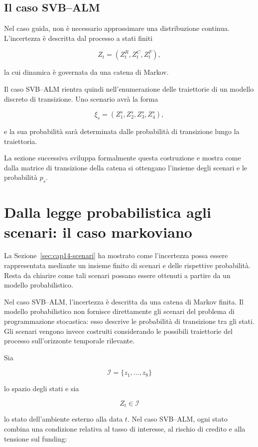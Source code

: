 \subsection{Il caso SVB--ALM}

Nel caso guida, non \`e necessario approssimare una distribuzione continua.
L'incertezza \`e descritta dal processo a stati finiti

\[
Z_t=(Z_t^R,Z_t^C,Z_t^F),
\]

\noindent la cui dinamica \`e governata da una catena di Markov.

Il caso SVB--ALM rientra quindi nell'enumerazione delle traiettorie di un
modello discreto di transizione. Uno scenario avr\`a la forma

\[
\xi_s=
\left(
Z_1^s,Z_2^s,Z_3^s,Z_4^s
\right),
\]

\noindent e la sua probabilit\`a sar\`a determinata dalle probabilit\`a di transizione
lungo la traiettoria.

La sezione successiva sviluppa formalmente questa costruzione e mostra come
dalla matrice di transizione della catena si ottengano l'insieme degli
scenari e le probabilit\`a $p_s$.

\section{Dalla legge probabilistica agli scenari: il caso markoviano}

\label{sec:cap14-scenari-markov}

La Sezione~\ref{sec:cap14-scenari} ha mostrato come l'incertezza possa
essere rappresentata mediante un insieme finito di scenari e delle
rispettive probabilit\`a. Resta da chiarire come tali scenari possano
essere ottenuti a partire da un modello probabilistico.

Nel caso SVB--ALM, l'incertezza \`e descritta da una catena di Markov
finita. Il modello probabilistico non fornisce direttamente gli scenari
del problema di programmazione stocastica: esso descrive le probabilit\`a
di transizione tra gli stati. Gli scenari vengono invece costruiti
considerando le possibili traiettorie del processo sull'orizzonte
temporale rilevante.

Sia

\[
\mathcal I=\{z_1,\ldots,z_8\}
\]

\noindent lo spazio degli stati e sia

\[
Z_t\in\mathcal I
\]

\noindent lo stato dell'ambiente esterno alla data $t$. Nel caso SVB--ALM, ogni
stato combina una condizione relativa al tasso di interesse, al rischio
di credito e alla tensione sul funding:

